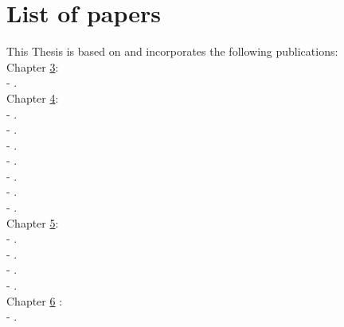 \chapter*{List of papers}\label{papers}

\noindent This Thesis is based on and incorporates the following publications:\\

\noindent Chapter \hyperref[lhrh]{3}:\\%
\noindent - .\\

\noindent Chapter \hyperref[performance]{4}:\\%
\noindent - .\\
\noindent - .\\
\noindent - .\\
\noindent - .\\
\noindent - .\\
\noindent - .\\
\noindent - .\\

\noindent Chapter \hyperref[emerging]{5}:\\%
\noindent - .\\
\noindent - .\\
\noindent - .\\
\noindent - .\\

\noindent Chapter \hyperref[front]{6} :\\%
\noindent - .\\

\cleardoublepage